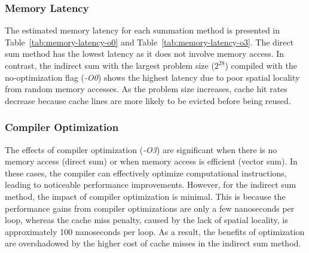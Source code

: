 \subsubsection{Memory Latency}

The estimated memory latency for each summation method is presented in Table~\ref{tab:memory-latency-o0} and Table~\ref{tab:memory-latency-o3}. The direct sum method has the lowest latency as it does not involve memory access. In contrast, the indirect sum with the largest problem size (\(2^{28}\)) compiled with the no-optimization flag (\textit{-O0}) shows the highest latency due to poor spatial locality from random memory accesses. As the problem size increases, cache hit rates decrease because cache lines are more likely to be evicted before being reused.

\subsubsection{Compiler Optimization}
The effects of compiler optimization (\textit{-O3}) are significant when there is no memory access (direct sum) or when memory access is efficient (vector sum). In these cases, the compiler can effectively optimize computational instructions, leading to noticeable performance improvements. However, for the indirect sum method, the impact of compiler optimization is minimal. This is because the performance gains from compiler optimizations are only a few nanoseconds per loop, whereas the cache miss penalty, caused by the lack of spatial locality, is approximately 100 nanoseconds per loop. As a result, the benefits of optimization are overshadowed by the higher cost of cache misses in the indirect sum method.